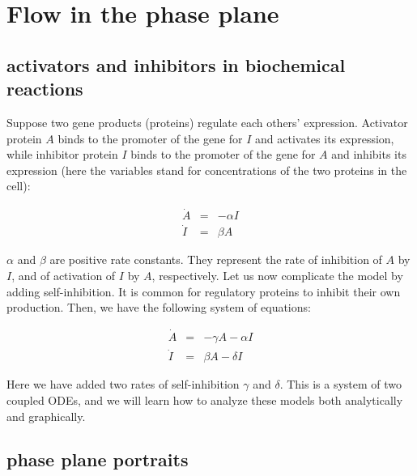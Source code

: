 \documentclass[
  letterpaper,
  DIV=11,
  numbers=noendperiod]{scrreprt}
\begin{document}
\hypertarget{flow-in-the-phase-plane}{%
\section{Flow in the phase plane}\label{flow-in-the-phase-plane}}

\hypertarget{activators-and-inhibitors-in-biochemical-reactions}{%
\subsection{activators and inhibitors in biochemical
reactions}\label{activators-and-inhibitors-in-biochemical-reactions}}

Suppose two gene products (proteins) regulate each others' expression.
Activator protein \(A\) binds to the promoter of the gene for \(I\) and
activates its expression, while inhibitor protein \(I\) binds to the
promoter of the gene for \(A\) and inhibits its expression (here the
variables stand for concentrations of the two proteins in the cell):

\[
\begin{aligned}
\dot  A & = & - \alpha I\\
\dot  I & = & \beta A\end{aligned}
\]

\(\alpha\) and \(\beta\) are positive rate constants. They represent the
rate of inhibition of \(A\) by \(I\), and of activation of \(I\) by
\(A\), respectively. Let us now complicate the model by adding
self-inhibition. It is common for regulatory proteins to inhibit their
own production. Then, we have the following system of equations:

\[
\begin{aligned}
\dot  A & = & - \gamma A - \alpha I\\
\dot  I & = & \beta A - \delta I
\end{aligned}
\]

Here we have added two rates of self-inhibition \(\gamma\) and
\(\delta\). This is a system of two coupled ODEs, and we will learn how
to analyze these models both analytically and graphically.

\hypertarget{phase-plane-portraits}{%
\subsection{phase plane portraits}\label{phase-plane-portraits}}
\end{document}
